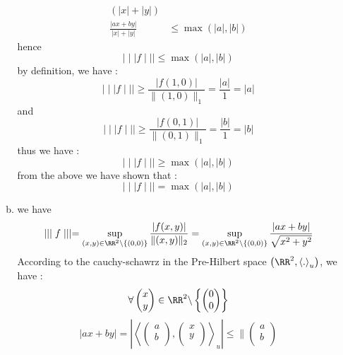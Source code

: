 \begin{example}
\begin{enumerate}[(1)]
\begin{enumerate}[(a)]
\begin{align*}
	\left( \left| x \right| + \left| y \right| \right)
	\\
	\frac{\left| ax + by \right|}{\left| x \right| + \left| y \right|} 
	& \leq 
	\max  \left( \left| a \right|, \left| b \right| \right)
	\end{align*}
	hence
	\[
	\mid \mid \mid  f \mid \mid \mid  
	\leq  \max  \left( \left| a \right|, \left| b \right| \right)
	\]
	by definition, we have : 
	\[
	\mid \mid \mid  f \mid \mid \mid  
	\geq  
	\frac{\left| f \left( 1,0 \right) \right|}{\| (1,0)  \|_{1} } = 
	\frac{\left| a \right|}{ 1} = 
	\left| a \right|
	\]
	and 
	\[
		\mid \mid \mid  f \mid \mid \mid  
		\geq 
		\frac{\left| f(0,1)  \right|}{\| (0,1)  \|_{1} } = 
		\frac{\left| b \right|}{1} = 
		\left| b \right|
	\]
	thus we have : 
	\[
	\mid \mid \mid  f \mid \mid \mid  
	\geq  \max  \left( 
		\left| a \right| ,
		\left| b \right|
	\right)
	\]
	from the above we have shown that : 
	\[
	\mid \mid \mid  f \mid \mid \mid  = 
	\max  \left( \left| a \right|,\left| b \right| \right)
	\]
\item we have 
	\[
	\mid \mid \mid  f \mid \mid \mid  =
	\sup_{(x,y) \in  \RR ^2 \backslash  \left\{ (0,0)  \right\}}  
	\frac{\left| f(x,y)  \right|}{\| (x,y)  \| _{2}} 
	= \sup_{(x,y)  \in \RR ^2 \backslash  \left\{ (0,0)  \right\}}  
	\frac{\left| ax + by \right|}{\sqrt{x^2 +y^2 } }
	\]
	According to the cauchy-schawrz in the Pre-Hilbert space 
	$\left( \RR ^2  , \left\langle . \right\rangle _{u}\right) $,
	we have :
	\[
	\forall  
	\begin{pmatrix}
		x \\
		y \\
	\end{pmatrix}
	\in  \RR^2 \backslash  \left\{ 
		\begin{pmatrix}
			0 \\
			0 \\
		\end{pmatrix}
	\right\}
	\]
	\[
	\left| ax + by \right| = 
	\left| \left\langle 
		\begin{pmatrix}
			a \\
			b \\
		\end{pmatrix}
		, 
		\begin{pmatrix}
			x \\
			y \\
		\end{pmatrix}
	\right\rangle_{u}  \right| 
	\leq 
	\| 
	\begin{pmatrix}
		a \\
		b \\

\end{pmatrix}\]
\end{enumerate}
\end{enumerate}
\end{example}
